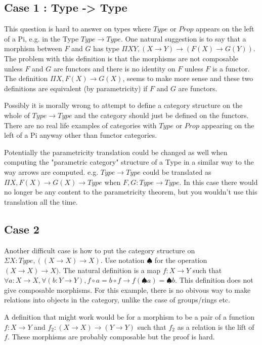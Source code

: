 \documentclass[12pt]{article} %
\theoremstyle{definition}
\theoremstyle{definition}
\theoremstyle{definition}
\theoremstyle{definition}
\begin{document}
\subsection{Case 1 : Type -> Type}

This question is hard to answer on types where $Type$ or $Prop$ appears on the left of a Pi,
e.g. in the Type $Type\rightarrow Type$. One natural suggestion is to say that a morphism between
$F$ and $G$ has type $\Pi X Y, (X \rightarrow Y) \rightarrow (F(X) \rightarrow G(Y))$. The problem 
with this definition is that the morphisms are not composable unless $F$ and $G$ are functors and 
there is no identity on $F$ unless $F$ is a functor. The definition $\Pi X, F(X) \rightarrow G(X)$,
seems to make more sense and these two definitions are equivalent (by parametricity) if $F$ and
$G$ are functors.

Possibly it is morally wrong to attempt to define a category structure on the whole of
$Type \rightarrow Type$ and the category should just be defined on the functors. 
There are no real life examples of categories with $Type$ or $Prop$ appearing on the left of a 
Pi anyway other than functor categories.

Potentially the parametricity translation could be changed as well when computing the 
"parametric category" structure of a Type in a similar way to the way arrows are computed.
e.g. $Type \rightarrow Type$ could be translated as 
$\Pi X, F(X) \rightarrow G(X) \rightarrow Type$ when $F,G : Type \rightarrow Type$. 
In this case there would no longer be any content to the parametricity theorem, but
you wouldn't use this translation all the time.

\subsection{Case 2}
Another difficult case is how to put the category structure on $\Sigma X : Type, ((X \rightarrow X) \rightarrow X)$.
Use notation $\spadesuit$ for the operation $(X \rightarrow X) \rightarrow X)$.
The natural definition is a map $f : X \rightarrow Y$ such that $\forall a : X \rightarrow X, 
\forall (b : Y \rightarrow Y), f \circ a = b \circ f \rightarrow f (\spadesuit a) = \spadesuit b$.
This definition does not give composable morphisms. For this example, there is no obivous way to make relations
into objects in the category, unlike the case of groups/rings etc.

A definition that might work would be for a morphism to be a pair of a 
function $f : X \rightarrow Y$ and $f_2 : (X \rightarrow X) \rightarrow (Y 
\rightarrow Y)$ such that $f_2$ as a relation is the lift of $f$.
These morphisms are probably composable but the proof is hard.
\end{document}
